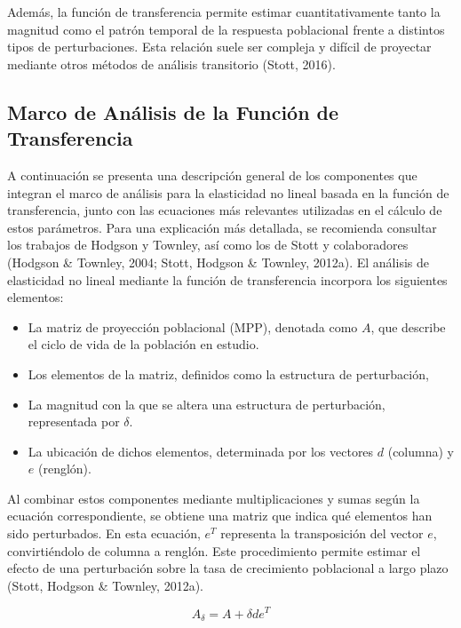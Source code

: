 \documentclass[
  12pt,
  letterpaper,
]{book}
\providecommand{\tightlist}{%
  \setlength{\itemsep}{0pt}\setlength{\parskip}{0pt}}\usepackage{longtable,booktabs,array}
\begin{document}
Además, la función de transferencia permite estimar cuantitativamente
tanto la magnitud como el patrón temporal de la respuesta poblacional
frente a distintos tipos de perturbaciones. Esta relación suele ser
compleja y difícil de proyectar mediante otros métodos de análisis
transitorio (Stott, 2016).

\subsection{Marco de Análisis de la Función de
Transferencia}\label{marco-de-anuxe1lisis-de-la-funciuxf3n-de-transferencia}

A continuación se presenta una descripción general de los componentes
que integran el marco de análisis para la elasticidad no lineal basada
en la función de transferencia, junto con las ecuaciones más relevantes
utilizadas en el cálculo de estos parámetros. Para una explicación más
detallada, se recomienda consultar los trabajos de Hodgson y Townley,
así como los de Stott y colaboradores (Hodgson \& Townley, 2004; Stott,
Hodgson \& Townley, 2012a). El análisis de elasticidad no lineal
mediante la función de transferencia incorpora los siguientes elementos:

\begin{itemize}
\tightlist
\item
  La matriz de proyección poblacional (MPP), denotada como \(A\), que
  describe el ciclo de vida de la población en estudio.
\item
  Los elementos de la matriz, definidos como la estructura de
  perturbación,
\item
  La magnitud con la que se altera una estructura de perturbación,
  representada por \(\delta\).
\item
  La ubicación de dichos elementos, determinada por los vectores \(d\)
  (columna) y \(e\) (renglón).
\end{itemize}

Al combinar estos componentes mediante multiplicaciones y sumas según la
ecuación correspondiente, se obtiene una matriz que indica qué elementos
han sido perturbados. En esta ecuación, \(e^T\) representa la
transposición del vector \(e\), convirtiéndolo de columna a renglón.
Este procedimiento permite estimar el efecto de una perturbación sobre
la tasa de crecimiento poblacional a largo plazo (Stott, Hodgson \&
Townley, 2012a).

\[A_{\delta}= A + \delta de^T\]
\end{document}
